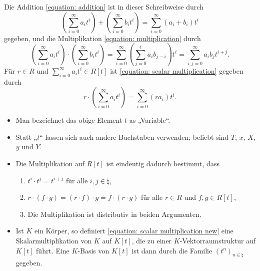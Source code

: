 Die Addition \eqref{equation: addition} ist in dieser Schreibweise durch
\begin{equation}
  \tag{A'}
    \left( \sum_{i=0}^\infty a_i t^i \right) + \left( \sum_{i=0}^\infty b_i t^i \right)
  = \sum_{i=0}^\infty (a_i + b_i) t^i
\end{equation}
gegeben, und die Multiplikation \eqref{equation: multiplication} durch
\begin{equation}
  \tag{M'}
    \left( \sum_{i=0}^\infty a_i t^i \right) \cdot \left( \sum_{i=0}^\infty b_i t^i \right)
  = \sum_{i=0}^\infty \left( \sum_{j=0}^i a_i b_{j-i} \right) t^i
  = \sum_{i,j=0}^\infty a_i b_j t^{i+j}.
\end{equation}
Für $r \in R$ und $\sum_{i=0}^\infty a_i t^i \in R[t]$ ist \eqref{equation: scalar multiplication} gegeben durch
\begin{equation}
  \tag{S'}
  \label{equation: scalar multiplication new}
    r \cdot \left( \sum_{i=0}^\infty a_i t^i \right)
  = \sum_{i=0}^\infty (r a_i) t^i.
\end{equation}


\begin{remark*}
  \begin{itemize}
    \item
      Man bezeichnet das obige Element $t$ as „Variable“.
    \item
      Statt „$t$“ lassen sich auch andere Buchstaben verwenden;
      beliebt sind $T$, $x$, $X$, $y$ und $Y$.
    \item
      Die Multiplikation auf $R[t]$ ist eindeutig dadurch bestimmt, dass
      \begin{enumerate}
        \item
          $t^i \cdot t^j = t^{i+j}$ für alle $i,j \in \natural$,
        \item
          $r \cdot (f \cdot g) = (r \cdot f) \cdot g = f \cdot (r \cdot g)$ für alle $r \in R$ und $f,g \in R[t]$,
        \item
          Die Multiplikation ist distributiv in beiden Argumenten.
      \end{enumerate}
    \item
      Ist $K$ ein Körper, so definiert \eqref{equation: scalar multiplication new} eine Skalarmultiplikation von $K$ auf $K[t]$, die zu einer $K$-Vektorraumstruktur auf $K[t]$ führt.
      Eine $K$-Basis von $K[t]$ ist dann durch die Familie $(t^n)_{n \in \natural}$ gegeben.
  \end{itemize}
\end{remark*}